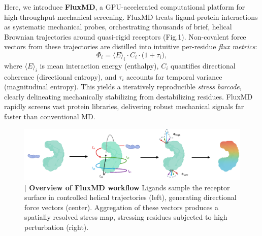 \documentclass[pdflatex,sn-mathphys-num]{sn-jnl}
\begin{document}
Here, we introduce \textbf{FluxMD}, a GPU-accelerated computational platform for high-throughput mechanical screening. FluxMD treats ligand-protein interactions as systematic mechanical probes, orchestrating thousands of brief, helical Brownian trajectories around quasi-rigid receptors (Fig.1). Non-covalent force vectors from these trajectories are distilled into intuitive per-residue \emph{flux metrics}:
\begin{equation}
\Phi_i = \bigl\langle E\bigr\rangle_i \cdot C_i \cdot \bigl(1+\tau_i\bigr),
\label{eq:flux}
\end{equation}
\noindent
where $\langle E\rangle_i$ is mean interaction energy (enthalpy), $C_i$ quantifies directional coherence (directional entropy), and $\tau_i$ accounts for temporal variance (magnitudinal entropy). This yields a iteratively reproducible \emph{stress barcode}, clearly delineating mechanically stabilizing from destabilizing residues. FluxMD rapidly screens vast protein libraries, delivering robust mechanical signals far faster than conventional MD.

\begin{figure}[h!]
  \centering
  \includegraphics[width=\textwidth]{Figure 1.png}
  \caption{\textbf{$\vert$ Overview of FluxMD workflow} Ligands sample the receptor surface in controlled helical trajectories (left), generating directional force vectors (center). Aggregation of these vectors produces a spatially resolved stress map, stressing residues subjected to high perturbation (right).}
  \label{fig:fluxmd-concept}
\end{figure}
\end{document}
